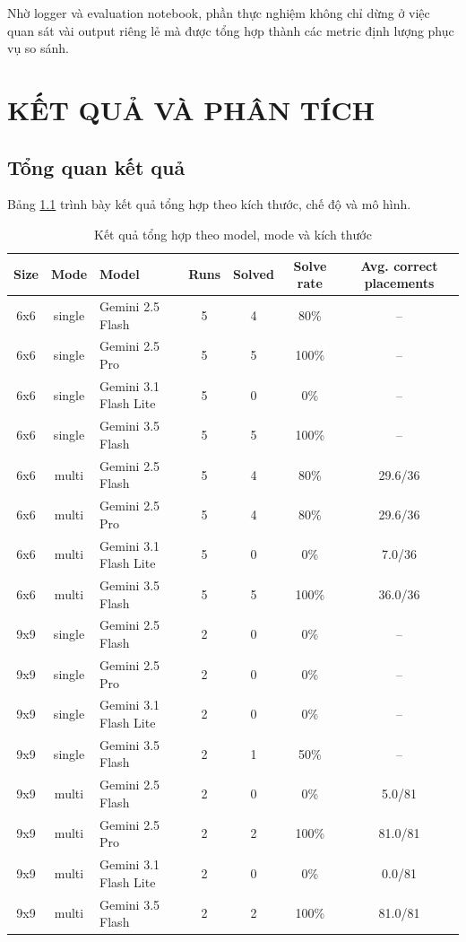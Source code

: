 \documentclass[12pt,a4paper,oneside]{report}
\begin{document}
Nhờ logger và evaluation notebook, phần thực nghiệm không chỉ dừng ở việc quan sát vài output riêng lẻ mà được tổng hợp thành các metric định lượng phục vụ so sánh.

\chapter{KẾT QUẢ VÀ PHÂN TÍCH}

\section{Tổng quan kết quả}

Bảng \ref{tab:summary-results} trình bày kết quả tổng hợp theo kích thước, chế độ và mô hình.

\begin{table}[H]
  \centering
  \caption{Kết quả tổng hợp theo model, mode và kích thước}
  \label{tab:summary-results}
  \scriptsize
  \begin{tabular}{ccp{3.4cm}cccc}
    \toprule
    Size & Mode & Model & Runs & Solved & Solve rate & Avg. correct placements \\
    \midrule
    6x6 & single & Gemini 2.5 Flash & 5 & 4 & 80\% & -- \\
    6x6 & single & Gemini 2.5 Pro & 5 & 5 & 100\% & -- \\
    6x6 & single & Gemini 3.1 Flash Lite & 5 & 0 & 0\% & -- \\
    6x6 & single & Gemini 3.5 Flash & 5 & 5 & 100\% & -- \\
    \midrule
    6x6 & multi & Gemini 2.5 Flash & 5 & 4 & 80\% & 29.6/36 \\
    6x6 & multi & Gemini 2.5 Pro & 5 & 4 & 80\% & 29.6/36 \\
    6x6 & multi & Gemini 3.1 Flash Lite & 5 & 0 & 0\% & 7.0/36 \\
    6x6 & multi & Gemini 3.5 Flash & 5 & 5 & 100\% & 36.0/36 \\
    \midrule
    9x9 & single & Gemini 2.5 Flash & 2 & 0 & 0\% & -- \\
    9x9 & single & Gemini 2.5 Pro & 2 & 0 & 0\% & -- \\
    9x9 & single & Gemini 3.1 Flash Lite & 2 & 0 & 0\% & -- \\
    9x9 & single & Gemini 3.5 Flash & 2 & 1 & 50\% & -- \\
    \midrule
    9x9 & multi & Gemini 2.5 Flash & 2 & 0 & 0\% & 5.0/81 \\
    9x9 & multi & Gemini 2.5 Pro & 2 & 2 & 100\% & 81.0/81 \\
    9x9 & multi & Gemini 3.1 Flash Lite & 2 & 0 & 0\% & 0.0/81 \\
    9x9 & multi & Gemini 3.5 Flash & 2 & 2 & 100\% & 81.0/81 \\
    \bottomrule
  \end{tabular}
\end{table}
\end{document}
